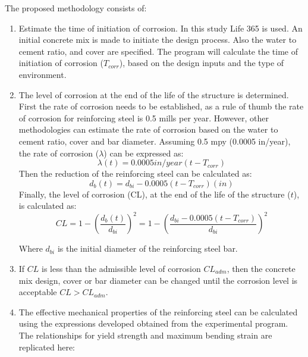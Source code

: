The proposed methodology consists of:
\begin{enumerate}
    \item Estimate the time of initiation of corrosion. In this study Life 365 is used. An initial concrete mix is made to initiate the design process. Also the water to cement ratio, and cover are specified. The program will calculate the time of initiation of corrosion ($T_{corr}$), based on the design inputs and the type of environment.
    \item The level of corrosion at the end of the life of the structure is determined. First the rate of corrosion needs to be established, as a rule of thumb the rate of corrosion for reinforcing steel is 0.5 mills per year. However, other methodologies can estimate the rate of corrosion based on the water to cement ratio, cover and bar diameter\cite{Weyers1994}\cite{Thoft-Christensen}. Assuming 0.5 mpy (0.0005 in/year), the rate of corrosion ($\lambda$) can be expressed as:
    \begin{equation}
        \lambda(t)=0.0005 in/year (t-T_{corr})
    \end{equation}
    Then the reduction of the reinforcing steel can be calculated as:
    \begin{equation}
    d_{b}(t)=d_{bi}-0.0005(t-T_{corr}) (in)
    \end{equation}
    Finally, the level of corrosion (CL), at the end of the life of the structure ($t$), is calculated as:
    \begin{equation}
    CL=1-\left(\frac{d_{b}(t)}{d_{bi}}\right)^2=1-\left(\frac{d_{bi}-0.0005(t-T_{corr})}{d_{bi}}\right)^2
    \end{equation}
    
    Where $d_{bi}$ is the initial diameter of the reinforcing steel bar.
    
    \item If $CL$ is less than the admissible level of corrosion $CL_{adm}$, then the concrete mix design, cover or bar diameter can be changed until the corrosion level is acceptable $CL>CL_{adm}$.
    
    \item The effective mechanical properties of the reinforcing steel can be calculated using the expressions developed obtained from the experimental program. The relationships for yield strength and maximum bending strain are replicated here:
    

\end{enumerate}
